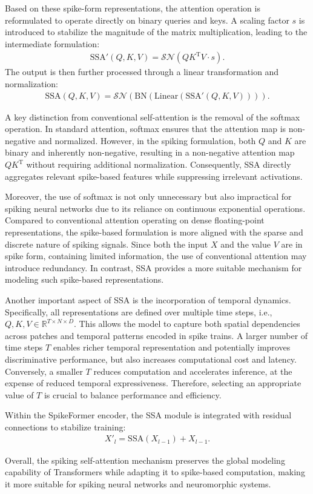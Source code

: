\documentclass[../main.tex]{subfiles}
\begin{document}
Based on these spike-form representations, the attention operation is reformulated to operate directly on binary queries and keys. A scaling factor $s$ is introduced to stabilize the magnitude of the matrix multiplication, leading to the intermediate formulation:
\begin{align}
\mathrm{SSA}'(Q,K,V) = \mathcal{SN}\left(QK^{\mathrm{T}}V \cdot s\right).
\end{align}
The output is then further processed through a linear transformation and normalization:
\begin{align}
\mathrm{SSA}(Q,K,V) = \mathcal{SN}\left(\mathrm{BN}(\mathrm{Linear}(\mathrm{SSA}'(Q,K,V)))\right).
\end{align}

A key distinction from conventional self-attention is the removal of the softmax operation. In standard attention, softmax ensures that the attention map is non-negative and normalized. However, in the spiking formulation, both $Q$ and $K$ are binary and inherently non-negative, resulting in a non-negative attention map $QK^{\mathrm{T}}$ without requiring additional normalization. Consequently, SSA directly aggregates relevant spike-based features while suppressing irrelevant activations.

Moreover, the use of softmax is not only unnecessary but also impractical for spiking neural networks due to its reliance on continuous exponential operations. Compared to conventional attention operating on dense floating-point representations, the spike-based formulation is more aligned with the sparse and discrete nature of spiking signals. Since both the input $X$ and the value $V$ are in spike form, containing limited information, the use of conventional attention may introduce redundancy. In contrast, SSA provides a more suitable mechanism for modeling such spike-based representations.

Another important aspect of SSA is the incorporation of temporal dynamics. Specifically, all representations are defined over multiple time steps, i.e., $Q, K, V \in \mathbb{R}^{T \times N \times D}$. This allows the model to capture both spatial dependencies across patches and temporal patterns encoded in spike trains. A larger number of time steps $T$ enables richer temporal representation and potentially improves discriminative performance, but also increases computational cost and latency. Conversely, a smaller $T$ reduces computation and accelerates inference, at the expense of reduced temporal expressiveness. Therefore, selecting an appropriate value of $T$ is crucial to balance performance and efficiency.

Within the SpikeFormer encoder, the SSA module is integrated with residual connections to stabilize training:
\begin{align}
X'_l = \mathrm{SSA}(X_{l-1}) + X_{l-1}.
\end{align}

Overall, the spiking self-attention mechanism preserves the global modeling capability of Transformers while adapting it to spike-based computation, making it more suitable for spiking neural networks and neuromorphic systems.
\end{document}
